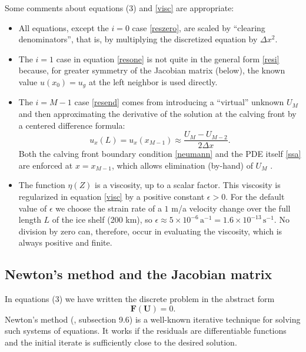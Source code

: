 \documentclass[11pt,final,reqno]{amsart}
\newcommand{\eps}{\epsilon}
\newcommand{\bbF}{\mathbf{F}}
\newcommand{\bU}{\mathbf{U}}
\begin{document}
Some comments about equations (3) and \eqref{visc} are appropriate:\begin{itemize}
\item All equations, except the $i=0$ case \eqref{reszero}, are scaled by ``clearing denominators'', that is, by multiplying the discretized equation by $\Delta x^2$.
\item The $i=1$ case in equation \eqref{resone} is not quite in the general form \eqref{resi} because, for greater symmetry of the Jacobian matrix (below), the known value $u(x_0)=u_g$ at the left neighbor is used directly.
\item The $i=M-1$ case \eqref{resend} comes from introducing a ``virtual'' unknown $U_{M}$ and then approximating the derivative of the solution at the calving front by a centered difference formula:
  $$u_x(L) = u_x(x_{M-1}) \approx \frac{U_M - U_{M-2}}{2\Delta x}.$$
Both the calving front boundary condition \eqref{neumann} and the PDE itself \eqref{ssa} are enforced at $x=x_{M-1}$, which allows elimination (by-hand) of $U_M$ \cite{MortonMayers}.
\item The function $\eta(Z)$ is a viscosity, up to a scalar factor.  This viscosity is regularized in equation \eqref{visc} by a positive constant $\eps>0$.  For the default value of $\eps$ we choose the strain rate of a $1$ m/a velocity change over the full length $L$ of the ice shelf (200 km), so $\eps \approx 5 \times 10^{-6}\,\text{a}^{-1} = 1.6 \times 10^{-13}\,\text{s}^{-1}$.   No division by zero can, therefore, occur in evaluating the viscosity, which is always positive and finite.
\end{itemize}

\subsection*{Newton's method and the Jacobian matrix}   In equations (3) we have written the discrete problem in the abstract form
	$$\bbF(\bU) = 0.$$
Newton's method (\cite{Pressetal}, subsection 9.6) is a well-known iterative technique for solving such systems of equations.  It works if the residuals are differentiable functions and the initial iterate is sufficiently close to the desired solution.
\end{document}
